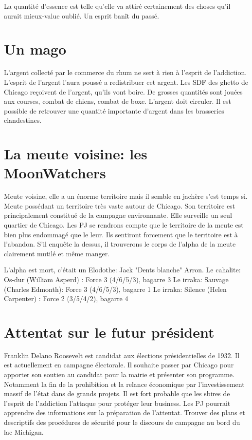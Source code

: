 \documentclass[oneside,12pt]{book}
\begin{document}
\begin{flushleft}
La quantité d'essence est telle qu'elle va attiré certainement des choses qu'il aurait mieux-value oublié. Un esprit banît du passé.

 
\section{Un mago}
L'argent collecté par le commerce du rhum ne sert à rien à l'esprit de l'addiction. L'esprit de l'argent l'aura poussé a redistribuer cet argent.
Les SDF des ghetto de Chicago reçoivent de l'argent, qu'ils vont boire.
De grosses quantités sont jouées aux courses, combat de chiens, combat de boxe. L'argent doit circuler.
Il est possible de retrouver une quantité importante d'argent dans les brasseries clandestines.  

\section{La meute voisine: les MoonWatchers}
Meute voisine, elle a un énorme territoire mais il semble en jachère s'est temps si. 
Meute possédant un territoire très vaste autour de Chicago. Son territoire est principalement constitué de la campagne environnante.
Elle surveille un seul quartier de Chicago. 
Les PJ se rendrons compte que le territoire de la meute est bien plus endommagé que le leur.
Ils sentiront forcement que le territoire est à l'abandon. 
S'il enquête la dessus, il trouverons le corps de l'alpha de la meute clairement mutilé et même manger. 

L'alpha est mort, c'était un Elodothe: Jack "Dents blanche" Arron.
Le cahalite: Os-dur (William Asperd) : Force 3 (4/6/5/3), bagarre 3
Le irraka: Sauvage (Charles Edmonth): Force 3 (4/6/5/3), bagarre 1
Le irraka: Silence  (Helen Carpenter) : Force 2 (3/5/4/2), bagarre 4
\section{Attentat sur le futur président}
Franklin Delano Roosevelt est candidat aux élections présidentielles de 1932. Il est actuellement en campagne électorale. 
Il souhaite passer par Chicago pour apporter son soutien au candidat pour la mairie et présenter son programme. 
Notamment la fin de la prohibition et la relance économique par l'investissement massif de l'état dans de grands projets.
Il est fort probable que les sbires de l'esprit de l'addiction l'attaque pour protéger leur business.
Les PJ pourrait apprendre des informations sur la préparation de l'attentat. Trouver des plans et descriptifs des procédures de sécurité 
pour le discours de campagne au bord du lac Michigan. 


\end{flushleft}
\end{document}
